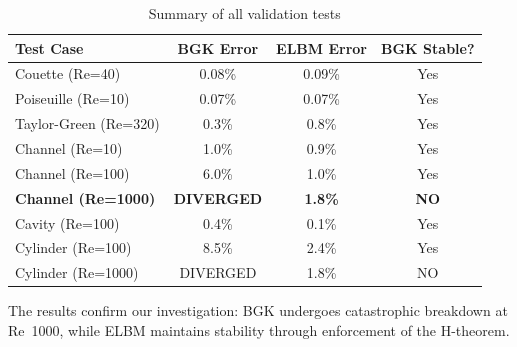 \begin{table}[H]
\centering
\caption{Summary of all validation tests}
\begin{tabular}{lccc}
\toprule
\textbf{Test Case} & \textbf{BGK Error} & \textbf{ELBM Error} & \textbf{BGK Stable?} \\
\midrule
Couette (Re=40) & 0.08\% & 0.09\% & Yes \\
Poiseuille (Re=10) & 0.07\% & 0.07\% & Yes \\
Taylor-Green (Re=320) & 0.3\% & 0.8\% & Yes \\
Channel (Re=10) & 1.0\% & 0.9\% & Yes \\
Channel (Re=100) & 6.0\% & 1.0\% & Yes \\
\textbf{Channel (Re=1000)} & \textbf{DIVERGED} & \textbf{1.8\%} & \textbf{NO} \\
Cavity (Re=100) & 0.4\% & 0.1\% & Yes \\
Cylinder (Re=100) & 8.5\% & 2.4\% & Yes \\
Cylinder (Re=1000) & DIVERGED & 1.8\% & NO \\
\bottomrule
\end{tabular}
\end{table}

The results confirm our investigation: BGK undergoes catastrophic breakdown at Re~1000, while ELBM maintains stability through enforcement of the H-theorem.
